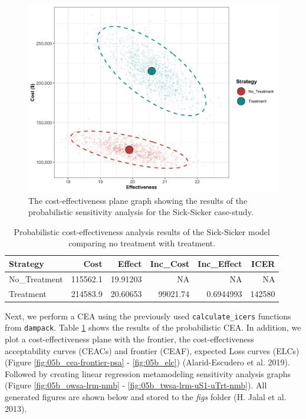 \documentclass[]{article}
\begin{document}
\begin{figure}
\centering
\includegraphics{../figs/05b_cea-plane-scatter.png}
\caption{The cost-effectiveness plane graph showing the results of the
probabilistic sensitivity analysis for the Sick-Sicker case-study.
\label{fig:05b_CEAplane}}
\end{figure}

\begin{table}[t]

\caption{\label{tab:unnamed-chunk-21}Probabilistic cost-effectiveness analysis results of the Sick-Sicker model comparing no treatment with treatment. \label{tab:df.cea.prob}}
\centering
\begin{tabular}{l|r|r|r|r|r}
\hline
Strategy & Cost & Effect & Inc\_Cost & Inc\_Effect & ICER\\
\hline
No\_Treatment & 115562.1 & 19.91203 & NA & NA & NA\\
\hline
Treatment & 214583.9 & 20.60653 & 99021.74 & 0.6944993 & 142580\\
\hline
\end{tabular}
\end{table}

Next, we perform a CEA using the previously used
\texttt{calculate\_icers} functions from \texttt{dampack}. Table
\ref{tab:df.cea.prob} shows the results of the probabilistic CEA. In
addition, we plot a cost-effectiveness plane with the frontier, the
cost-effectiveness acceptability curves (CEACs) and frontier (CEAF),
expected Loss curves (ELCs) (Figure \ref{fig:05b_cea-frontier-psa} -
\ref{fig:05b_elc}) (Alarid-Escudero et al. 2019). Followed by creating
linear regression metamodeling sensitivity analysis graphs (Figure
\ref{fig:05b_owsa-lrm-nmb} - \ref{fig:05b_twsa-lrm-uS1-uTrt-nmb}). All
generated figures are shown below and stored to the \emph{figs} folder
(H. Jalal et al. 2013).
\end{document}
